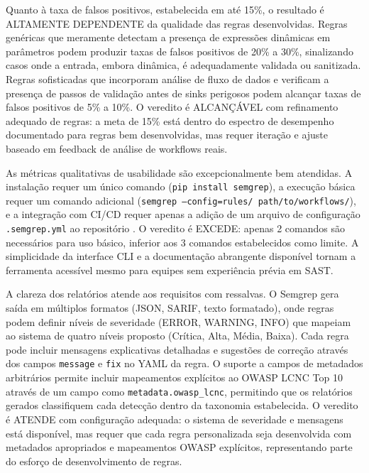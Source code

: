 \documentclass{sftex}
\begin{document}
Quanto à taxa de falsos positivos, estabelecida em até 15\%, o resultado é ALTAMENTE DEPENDENTE da qualidade das regras desenvolvidas. Regras genéricas que meramente detectam a presença de expressões dinâmicas em parâmetros podem produzir taxas de falsos positivos de 20\% a 30\%, sinalizando casos onde a entrada, embora dinâmica, é adequadamente validada ou sanitizada. Regras sofisticadas que incorporam análise de fluxo de dados e verificam a presença de passos de validação antes de sinks perigosos podem alcançar taxas de falsos positivos de 5\% a 10\%. O veredito é ALCANÇÁVEL com refinamento adequado de regras: a meta de 15\% está dentro do espectro de desempenho documentado para regras bem desenvolvidas, mas requer iteração e ajuste baseado em feedback de análise de workflows reais.

As métricas qualitativas de usabilidade são excepcionalmente bem atendidas. A instalação requer um único comando (\texttt{pip install semgrep}), a execução básica requer um comando adicional (\texttt{semgrep --config=rules/ path/to/workflows/}), e a integração com CI/CD requer apenas a adição de um arquivo de configuração \texttt{.semgrep.yml} ao repositório \cite{gitlab_sast}. O veredito é EXCEDE: apenas 2 comandos são necessários para uso básico, inferior aos 3 comandos estabelecidos como limite. A simplicidade da interface CLI e a documentação abrangente disponível tornam a ferramenta acessível mesmo para equipes sem experiência prévia em SAST.

A clareza dos relatórios atende aos requisitos com ressalvas. O Semgrep gera saída em múltiplos formatos (JSON, SARIF, texto formatado), onde regras podem definir níveis de severidade (ERROR, WARNING, INFO) que mapeiam ao sistema de quatro níveis proposto (Crítica, Alta, Média, Baixa). Cada regra pode incluir mensagens explicativas detalhadas e sugestões de correção através dos campos \texttt{message} e \texttt{fix} no YAML da regra. O suporte a campos de metadados arbitrários permite incluir mapeamentos explícitos ao OWASP LCNC Top 10 através de um campo como \texttt{metadata.owasp\_lcnc}, permitindo que os relatórios gerados classifiquem cada detecção dentro da taxonomia estabelecida. O veredito é ATENDE com configuração adequada: o sistema de severidade e mensagens está disponível, mas requer que cada regra personalizada seja desenvolvida com metadados apropriados e mapeamentos OWASP explícitos, representando parte do esforço de desenvolvimento de regras.
\end{document}
